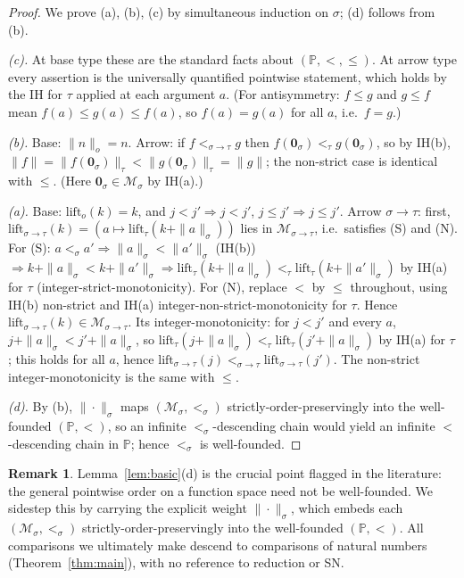 \documentclass{amsart}
\theoremstyle{definition}
\newtheorem{remark}{Remark}
\begin{document}
\begin{proof}
We prove (a), (b), (c) by simultaneous induction on $\sigma$; (d) follows from (b).

\emph{(c).} At base type these are the standard facts about $(\mathbb P,<,\le)$. At arrow
type every assertion is the universally quantified pointwise statement, which holds by the
IH for $\tau$ applied at each argument $a$. (For antisymmetry: $f\le g$ and $g\le f$ mean
$f(a)\le g(a)\le f(a)$, so $f(a)=g(a)$ for all $a$, i.e.\ $f=g$.)

\emph{(b).} Base: $\|n\|_o=n$. Arrow: if $f<_{\sigma\to\tau}g$ then
$f(\mathbf 0_\sigma)<_\tau g(\mathbf 0_\sigma)$, so by IH(b),
$\|f\|=\|f(\mathbf 0_\sigma)\|_\tau<\|g(\mathbf 0_\sigma)\|_\tau=\|g\|$; the non-strict case
is identical with $\le$. (Here $\mathbf 0_\sigma\in\mathcal M_\sigma$ by IH(a).)

\emph{(a).} Base: $\mathrm{lift}_o(k)=k$, and $j<j'\Rightarrow j<j'$, $j\le j'\Rightarrow
j\le j'$. Arrow $\sigma\to\tau$: first, $\mathrm{lift}_{\sigma\to\tau}(k)=
(a\mapsto\mathrm{lift}_\tau(k+\|a\|_\sigma))$ lies in $\mathcal M_{\sigma\to\tau}$, i.e.\
satisfies (S) and (N). For (S): $a<_\sigma a'\Rightarrow\|a\|_\sigma<\|a'\|_\sigma$ (IH(b))
$\Rightarrow k+\|a\|_\sigma<k+\|a'\|_\sigma\Rightarrow
\mathrm{lift}_\tau(k+\|a\|_\sigma)<_\tau\mathrm{lift}_\tau(k+\|a'\|_\sigma)$ by IH(a) for
$\tau$ (integer-strict-monotonicity). For (N), replace $<$ by $\le$ throughout, using IH(b)
non-strict and IH(a) integer-non-strict-monotonicity for $\tau$. Hence
$\mathrm{lift}_{\sigma\to\tau}(k)\in\mathcal M_{\sigma\to\tau}$. Its integer-monotonicity:
for $j<j'$ and every $a$, $j+\|a\|_\sigma<j'+\|a\|_\sigma$, so
$\mathrm{lift}_\tau(j+\|a\|_\sigma)<_\tau\mathrm{lift}_\tau(j'+\|a\|_\sigma)$ by IH(a) for
$\tau$; this holds for all $a$, hence $\mathrm{lift}_{\sigma\to\tau}(j)<_{\sigma\to\tau}
\mathrm{lift}_{\sigma\to\tau}(j')$. The non-strict integer-monotonicity is the same with
$\le$.

\emph{(d).} By (b), $\|\cdot\|_\sigma$ maps $(\mathcal M_\sigma,<_\sigma)$
strictly-order-preservingly into the well-founded $(\mathbb P,<)$, so an infinite
$<_\sigma$-descending chain would yield an infinite $<$-descending chain in $\mathbb P$;
hence $<_\sigma$ is well-founded.
\end{proof}

\begin{remark}
Lemma~\ref{lem:basic}(d) is the crucial point flagged in the literature: the general
pointwise order on a function space need not be well-founded. We sidestep this by carrying
the explicit weight $\|\cdot\|_\sigma$, which embeds each $(\mathcal M_\sigma,<_\sigma)$
strictly-order-preservingly into the well-founded $(\mathbb P,<)$. All comparisons we
ultimately make descend to comparisons of natural numbers (Theorem~\ref{thm:main}), with no
reference to reduction or SN.
\end{remark}
\end{document}
